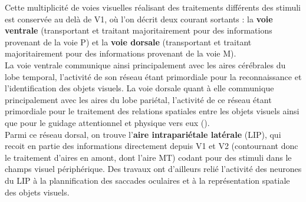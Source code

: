 Cette multiplicité de voies visuelles réalisant des traitements différents des stimuli est conservée au delà de V1, où l'on décrit deux courant sortants : la \textbf{voie ventrale} (transportant et traitant majoritairement pour des informations provenant de la voie P) et la \textbf{voie dorsale} (transportant et traitant majoritairement pour des informations provenant de la voie M).\\
La voie ventrale communique ainsi principalement avec les aires cérébrales du lobe temporal, l'activité de son réseau étant primordiale pour la reconnaissance et l'identification des objets visuels. La voie dorsale quant à elle communique principalement avec les aires du lobe pariétal, l'activité de ce réseau étant primordiale pour le traitement des relations spatiales entre les objets visuels ainsi que pour le guidage attentionnel et physique vers eux (\cite{Werner2014}).\\
Parmi ce réseau dorsal, on trouve l'\textbf{aire intrapariétale latérale} (LIP), qui recoit en partie des informations directement depuis V1 et V2 (contournant donc le traitement d'aires en amont, dont l'aire MT) codant pour des stimuli dans le champs visuel périphérique. Des travaux ont d'ailleurs relié l'activité des neurones du LIP à la plannification des saccades oculaires et à la représentation spatiale des objets visuels.


